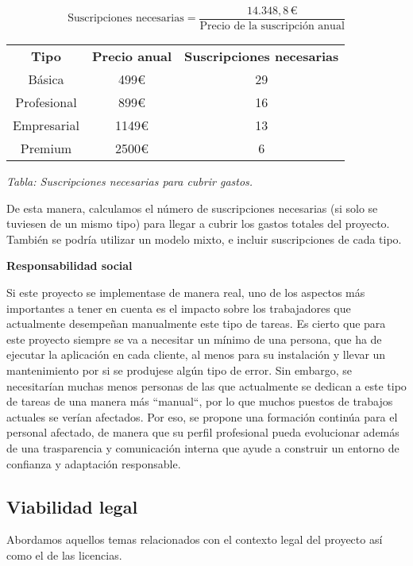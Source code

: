 \[
    \text{Suscripciones necesarias} = \frac{14.348{,}8\,€}{\text{Precio de la suscripción anual}}
\]

\begin{center}
    \begin{tabular}{| c | c | c | }\hline
    \Xhline{2\arrayrulewidth}
    \textbf{Tipo} & \textbf{Precio anual} & \textbf{Suscripciones necesarias} \\ \Xhline{2\arrayrulewidth}
    Básica & 499€ & 29 \\ \hline
    Profesional & 899€ & 16 \\ \hline
    Empresarial & 1149€ & 13 \\ \hline
    Premium & 2500€ & 6 \\ \hline
    \end{tabular}


    \vspace{0.3em}
    \textit{Tabla: Suscripciones necesarias para cubrir gastos.}
\end{center}

De esta manera, calculamos el número de suscripciones necesarias (si solo se tuviesen de un mismo tipo)
para llegar a cubrir los gastos totales del proyecto.
También se podría utilizar un modelo mixto, e incluir suscripciones de cada tipo.

\textbf{Responsabilidad social}

Si este proyecto se implementase de manera real, uno de los aspectos más importantes a tener en cuenta es el impacto
sobre los trabajadores que actualmente desempeñan manualmente este tipo de tareas.
Es cierto que para este proyecto siempre se va a necesitar un mínimo de una persona, que ha de ejecutar la aplicación
en cada cliente, al menos para su instalación y llevar un mantenimiento por si se produjese algún tipo de error.
Sin embargo, se necesitarían muchas menos personas de las que actualmente se dedican a este tipo de tareas de una manera
más ``manual``, por lo que muchos puestos de trabajos actuales se verían afectados.
Por eso, se propone una formación continúa para el personal afectado, de manera que su perfil profesional pueda evolucionar
además de una trasparencia y comunicación interna que ayude a construir un entorno de confianza y adaptación responsable.

\subsection{Viabilidad legal}

Abordamos aquellos temas relacionados con el contexto legal del proyecto así como el de las licencias.

